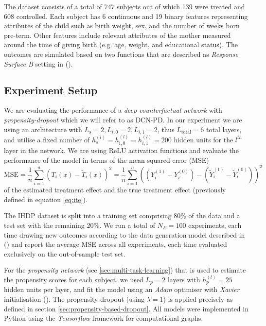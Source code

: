  The dataset consists of a total of 747 subjects out of which 139 were treated and 608 controlled. Each subject has 6 continuous and 19 binary features representing attributes of the child such as birth weight, sex, and the number of weeks born pre-term. Other features include relevant attributes of the mother measured around the time of giving birth (e.g. age, weight, and educational status). The outcomes are simulated based on two functions that are described as \emph{Response Surface B} setting in (\cite{hill}). 
 

\subsection{Experiment Setup} \label{sec:pbd-experiment-setup}
We are evaluating the performance of a \emph{deep counterfactual network} with \emph{propensity-dropout} which we will refer to as DCN-PD. In our experiment we are using an architecture with $L_s = 2, L_{i,0} =2 , L_{i,1} = 2$, thus $L_{\text{total}} = 6$ total layers, 
and utilise a fixed number of $h_s^{(l)} = h_{i,0}^{(l)} = h_{i,1}^{(l)} = 200$ hidden units for the $l^{th}$ layer in the network. We are using ReLU activation functions and evaluate the performance of the model in terms of the mean squared error (MSE)
\begin{equation} \label{eq:mse-ite}
\text{MSE} = \frac{1}{n}\sum_{i=1}^{n} (T_i(x) - \tilde{T}_i(x))^2 = \frac{1}{n}\sum_{i=1}^{n} ((Y_i^{(1)} - Y_i^{(0)}) - (\tilde{Y}_i^{(1)} - \tilde{Y}_i^{(0)}))^2
\end{equation}
 of the estimated treatment effect and the true treatment effect (previously defined in equation \ref{eq:ite}).  

The IHDP dataset is split into a training set comprising 80\% of the data and a test set with the remaining 20\%. We run a total of $N_E = 100$ experiments, each time drawing new outcomes according to the data generation model described in (\cite{hill})
and report the average MSE across all experiments, each time evaluated exclusively on the out-of-sample test set. 

For the \emph{propensity network} (see \ref{sec:multi-task-learning}) that is used to estimate the propensity scores for each subject, we used $L_p = 2$ layers with $h_p^{(l)} = 25$ hidden units per layer, and fit the model using an \emph{Adam} optimiser with \emph{Xavier} initialisation (\cite{adam}).
The propensity-dropout (using $\lambda = 1$) is applied precisely as defined in section \ref{sec:propensity-based-dropout}. All models were implemented in Python using the \emph{Tensorflow}  framework for computational graphs.

